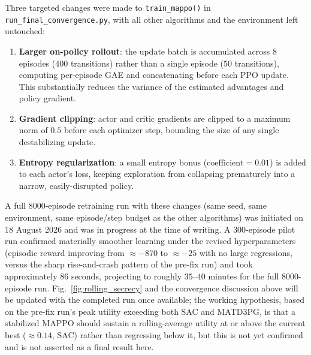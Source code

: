 \documentclass[journal,onecolumn]{IEEEtran}
\begin{document}
Three targeted changes were made to \texttt{train\_mappo()} in \texttt{run\_final\_convergence.py}, with all other algorithms and the environment left untouched:
\begin{enumerate}
    \item \textbf{Larger on-policy rollout}: the update batch is accumulated across $8$ episodes ($400$ transitions) rather than a single episode ($50$ transitions), computing per-episode GAE and concatenating before each PPO update. This substantially reduces the variance of the estimated advantages and policy gradient.
    \item \textbf{Gradient clipping}: actor and critic gradients are clipped to a maximum norm of $0.5$ before each optimizer step, bounding the size of any single destabilizing update.
    \item \textbf{Entropy regularization}: a small entropy bonus ($\text{coefficient}=0.01$) is added to each actor's loss, keeping exploration from collapsing prematurely into a narrow, easily-disrupted policy.
\end{enumerate}
A full $8000$-episode retraining run with these changes (same seed, same environment, same episode/step budget as the other algorithms) was initiated on 18 August 2026 and was in progress at the time of writing. A $300$-episode pilot run confirmed materially smoother learning under the revised hyperparameters (episodic reward improving from $\approx -870$ to $\approx -25$ with no large regressions, versus the sharp rise-and-crash pattern of the pre-fix run) and took approximately $86$ seconds, projecting to roughly $35$--$40$ minutes for the full $8000$-episode run. Fig.~\ref{fig:rolling_secrecy} and the convergence discussion above will be updated with the completed run once available; the working hypothesis, based on the pre-fix run's peak utility exceeding both SAC and MATD3PG, is that a stabilized MAPPO should sustain a rolling-average utility at or above the current best ($\approx 0.14$, SAC) rather than regressing below it, but this is not yet confirmed and is not asserted as a final result here.
\end{document}
